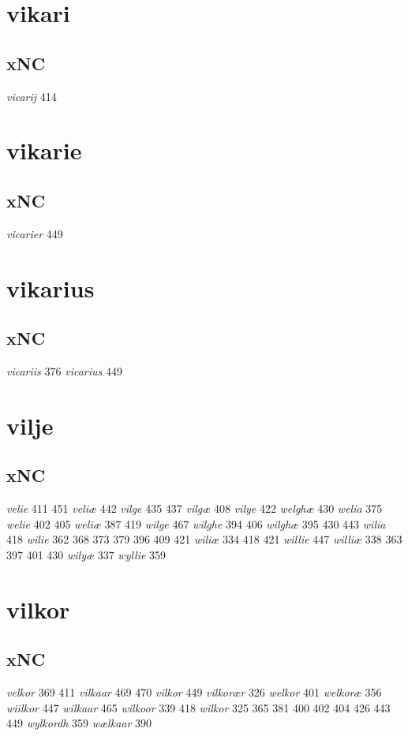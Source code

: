 \documentclass[a4paper,twocolumn]{article}
\begin{document}
\section{vikari}
\label{sec:org98c31b6}
\subsection{xNC}
\label{sec:org18167c3}
\emph{vicarij} 414 
\section{vikarie}
\label{sec:orgeaa769c}
\subsection{xNC}
\label{sec:org45c3339}
\emph{vicarier} 449 
\section{vikarius}
\label{sec:org9faa0f1}
\subsection{xNC}
\label{sec:org4a32f74}
\emph{vicariis} 376 \emph{vicarius} 449 
\section{vilje}
\label{sec:org5ae0522}
\subsection{xNC}
\label{sec:org7addd3b}
\emph{velie} 411 451 \emph{veliæ} 442 \emph{vilge} 435 437 \emph{vilgæ} 408 \emph{vilye} 422 \emph{welghæ} 430 \emph{welia} 375 \emph{welie} 402 405 \emph{weliæ} 387 419 \emph{wilge} 467 \emph{wilghe} 394 406 \emph{wilghæ} 395 430 443 \emph{wilia} 418 \emph{wilie} 362 368 373 379 396 409 421 \emph{wiliæ} 334 418 421 \emph{willie} 447 \emph{williæ} 338 363 397 401 430 \emph{wilyæ} 337 \emph{wyllie} 359 
\section{vilkor}
\label{sec:org68f4334}
\subsection{xNC}
\label{sec:orgbbdcf83}
\emph{velkor} 369 411 \emph{vilkaar} 469 470 \emph{vilkor} 449 \emph{vilkorær} 326 \emph{welkor} 401 \emph{welkoræ} 356 \emph{wiilkor} 447 \emph{wilkaar} 465 \emph{wilkoor} 339 418 \emph{wilkor} 325 365 381 400 402 404 426 443 449 \emph{wylkordh} 359 \emph{wælkaar} 390 
\end{document}
